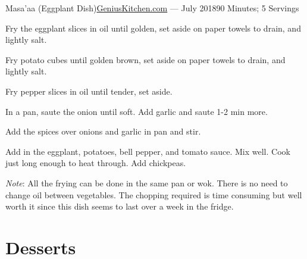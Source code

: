\documentclass{article}
\begin{document}
\begin{recipe}{Masa'aa (Eggplant Dish)}{\href{http://www.geniuskitchen.com/recipe/egyptian-eggplant-dish-masaaa-419171}{GeniusKitchen.com} --- July 2018}{90 Minutes; 5 Servings} 

  Fry the eggplant slices in oil until golden, set aside on paper towels to
  drain, and lightly salt.

  Fry potato cubes until golden brown, set aside on paper towels to drain, and
  lightly salt.

  Fry pepper slices in oil until tender, set aside.

  In a pan, saute the onion until soft. Add garlic and saute 1-2 min more.

  Add the spices over onions and garlic in pan and stir.

  Add in the eggplant, potatoes, bell pepper, and tomato sauce. Mix well. Cook
  just long enough to heat through. Add chickpeas.

  \freeform
  \emph{Note}: All the frying can be done in the same pan or wok. There is no
  need to change oil between vegetables. The chopping required is time
  consuming but well worth it since this dish seems to last over a week in the
  fridge.

\end{recipe}

\section{Desserts}
\end{document}
